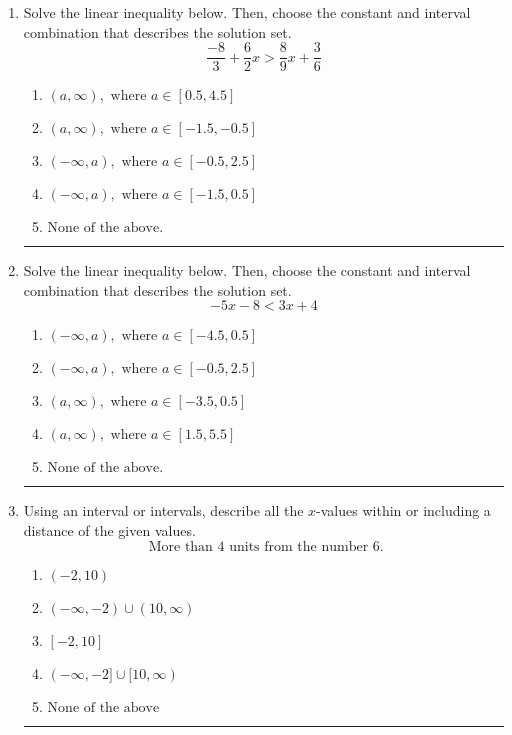 \documentclass[14pt]{extbook}
\newcommand{\litem}[1]{\item#1\hspace*{-1cm}\rule{\textwidth}{0.4pt}}
\begin{document}
\begin{enumerate}
{\begin{enumerate}[label=\Alph*.]
\end{enumerate} }
\litem{
Solve the linear inequality below. Then, choose the constant and interval combination that describes the solution set.\[ \frac{-8}{3} + \frac{6}{2} x > \frac{8}{9} x + \frac{3}{6} \]\begin{enumerate}[label=\Alph*.]
\item \( (a, \infty), \text{ where } a \in [0.5, 4.5] \)
\item \( (a, \infty), \text{ where } a \in [-1.5, -0.5] \)
\item \( (-\infty, a), \text{ where } a \in [-0.5, 2.5] \)
\item \( (-\infty, a), \text{ where } a \in [-1.5, 0.5] \)
\item \( \text{None of the above}. \)

\end{enumerate} }
\litem{
Solve the linear inequality below. Then, choose the constant and interval combination that describes the solution set.\[ -5x -8 < 3x + 4 \]\begin{enumerate}[label=\Alph*.]
\item \( (-\infty, a), \text{ where } a \in [-4.5, 0.5] \)
\item \( (-\infty, a), \text{ where } a \in [-0.5, 2.5] \)
\item \( (a, \infty), \text{ where } a \in [-3.5, 0.5] \)
\item \( (a, \infty), \text{ where } a \in [1.5, 5.5] \)
\item \( \text{None of the above}. \)

\end{enumerate} }
\litem{
Using an interval or intervals, describe all the $x$-values within or including a distance of the given values.\[ \text{ More than } 4 \text{ units from the number } 6. \]\begin{enumerate}[label=\Alph*.]
\item \( (-2, 10) \)
\item \( (-\infty, -2) \cup (10, \infty) \)
\item \( [-2, 10] \)
\item \( (-\infty, -2] \cup [10, \infty) \)
\item \( \text{None of the above} \)


\end{enumerate}}
\end{enumerate}
\end{document}
